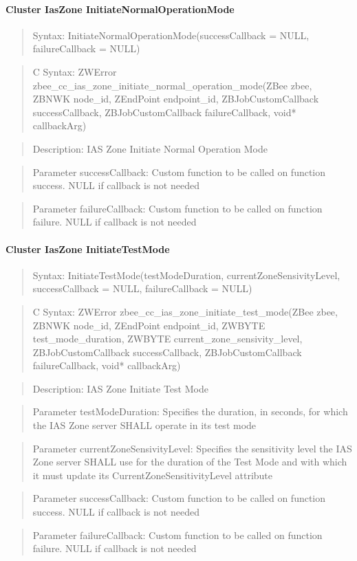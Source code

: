 \paragraph{Cluster IasZone InitiateNormalOperationMode}
\begin{quote}Syntax: InitiateNormalOperationMode(successCallback = NULL, failureCallback = NULL)\end{quote}
\begin{quote}C Syntax: ZWError zbee\_cc\_ias\_zone\_initiate\_normal\_operation\_mode(ZBee zbee, ZBNWK node\_id, ZEndPoint endpoint\_id, ZBJobCustomCallback successCallback, ZBJobCustomCallback failureCallback, void* callbackArg)\end{quote}
\begin{quote}Description: IAS Zone Initiate Normal Operation Mode\end{quote}
\begin{quote}Parameter successCallback: Custom function to be called on function success. NULL if callback is not needed\end{quote}
\begin{quote}Parameter failureCallback: Custom function to be called on function failure. NULL if callback is not needed\end{quote}


\paragraph{Cluster IasZone InitiateTestMode}
\begin{quote}Syntax: InitiateTestMode(testModeDuration, currentZoneSensivityLevel, successCallback = NULL, failureCallback = NULL)\end{quote}
\begin{quote}C Syntax: ZWError zbee\_cc\_ias\_zone\_initiate\_test\_mode(ZBee zbee, ZBNWK node\_id, ZEndPoint endpoint\_id, ZWBYTE test\_mode\_duration, ZWBYTE current\_zone\_sensivity\_level, ZBJobCustomCallback successCallback, ZBJobCustomCallback failureCallback, void* callbackArg)\end{quote}
\begin{quote}Description: IAS Zone Initiate Test Mode\end{quote}
\begin{quote}Parameter testModeDuration: Specifies the duration, in seconds, for which the IAS Zone server SHALL operate in its test mode\end{quote}
\begin{quote}Parameter currentZoneSensivityLevel: Specifies the sensitivity level the IAS Zone server SHALL use for the duration of the Test Mode and with which it must update its CurrentZoneSensitivityLevel attribute\end{quote}
\begin{quote}Parameter successCallback: Custom function to be called on function success. NULL if callback is not needed\end{quote}
\begin{quote}Parameter failureCallback: Custom function to be called on function failure. NULL if callback is not needed\end{quote}


